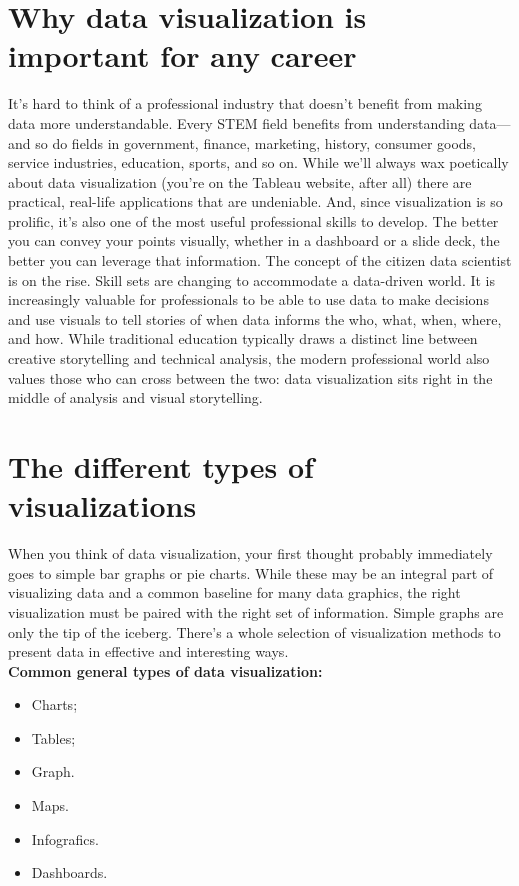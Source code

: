 \section{Why data visualization is important for any career}
It’s hard to think of a professional industry that doesn’t benefit from making data more understandable. Every STEM field benefits from understanding data—and so do fields in government, finance, marketing, history, consumer goods, service industries, education, sports, and so on.
While we’ll always wax poetically about data visualization (you’re on the Tableau website, after all) there are practical, real-life applications that are undeniable. And, since visualization is so prolific, it’s also one of the most useful professional skills to develop. The better you can convey your points visually, whether in a dashboard or a slide deck, the better you can leverage that information.
The concept of the citizen data scientist is on the rise. Skill sets are changing to accommodate a data-driven world. It is increasingly valuable for professionals to be able to use data to make decisions and use visuals to tell stories of when data informs the who, what, when, where, and how. While traditional education typically draws a distinct line between creative storytelling and technical analysis, the modern professional world also values those who can cross between the two: data visualization sits right in the middle of analysis and visual storytelling.
\section{The different types of visualizations}
When you think of data visualization, your first thought probably immediately goes to simple bar graphs or pie charts. While these may be an integral part of visualizing data and a common baseline for many data graphics, the right visualization must be paired with the right set of information. Simple graphs are only the tip of the iceberg. There’s a whole selection of visualization methods to present data in effective and interesting ways.\\

\textbf{Common general types of data visualization:}
\begin{itemize}
\item Charts;
\item Tables;
\item Graph.
\item Maps.
\item Infografics.
\item Dashboards.
\end{itemize}

